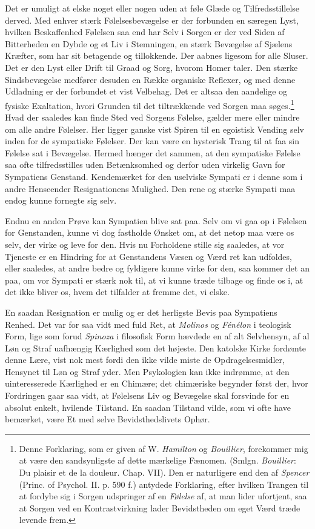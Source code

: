 \documentclass[12pt,a4paper,openany]{book}
\newcommand{\opage}[1]{\marginnote{\footnotesize\textit{[#1]}}}
\begin{document}
Det er umuligt at elske noget eller nogen uden at føle Glæde og
Tilfredsstillelse derved. Med enhver stærk Følelsesbevægelse er der
forbunden en særegen Lyst, hvilken Beskaffenhed Følelsen saa end har
Selv i Sorgen er der ved Siden af Bitterheden en Dybde og et Liv i
Stemningen, en stærk Bevægelse af Sjælens Kræfter, som har sit betagende
og tillokkende. Der aabnes ligesom for alle Sluser. Det er den Lyst
eller Drift til Graad og Sorg, hvorom Homer taler. Den stærke
Sindsbevægelse medfører desuden en Række organiske Reflexer, og med
denne Udladning er der forbundet et vist Velbehag. Det er altsaa den
aandelige og fysiske Exaltation, hvori Grunden til det tiltrækkende ved
Sorgen maa søges.\footnote[1]{Denne Forklaring, som er given af W.
\emph{Hamilton} og \emph{Bouillier}, forekommer mig at være den
sandsynligste af dette mærkelige Fænomen. (Smlgn. \emph{Bouillier}: Du
plaisir et de la douleur. Chap. VII). Den er naturligere end den af
\emph{Spencer} (Princ. of Psychol. II. p. 590 f.) antydede Forklaring,
efter hvilken Trangen til at fordybe sig i Sorgen udspringer af en
\emph{Følelse} af, at man lider ufortjent, saa at Sorgen ved en
Kontrastvirkning lader Bevidstheden om eget Værd træde levende frem.}
\opage{309}Hvad der saaledes kan finde Sted ved Sorgens Følelse, gælder
mere eller mindre om alle andre Følelser. Her ligger ganske vist Spiren
til en egoistisk Vending selv inden for de sympatiske Følelser. Der kan
være en hysterisk Trang til at faa sin Følelse sat i Bevægelse. Hermed
hænger det sammen, at den sympatiske Følelse saa ofte tilfredsstilles
uden Betænksomhed og derfor uden virkelig Gavn for Sympatiens Genstand.
Kendemærket for den uselviske Sympati er i denne som i andre Henseender
Resignationens Mulighed. Den rene og stærke Sympati maa endog kunne
fornegte sig selv.

Endnu en anden Prøve kan Sympatien blive sat paa. Selv om vi gaa op i
Følelsen for Genstanden, kunne vi dog fastholde Ønsket om, at det netop
maa være os selv, der virke og leve for den. Hvis nu Forholdene stille
sig saaledes, at vor Tjeneste er en Hindring for at Genstandens Væsen og
Værd ret kan udfoldes, eller saaledes, at andre bedre og fyldigere kunne
virke for den, saa kommer det an paa, om vor Sympati er stærk nok til,
at vi kunne træde tilbage og finde os i, at det ikke bliver os, hvem det
tilfalder at fremme det, vi elske.

En saadan Resignation er mulig og er det herligste Bevis paa Sympatiens
Renhed. Det var for saa vidt med fuld Ret, at \emph{Molinos} og
\emph{Fénélon} i teologisk Form, lige som forud \emph{Spinoza} i
filosofisk Form hævdede en af alt Selvhensyn, af al Løn og Straf
uafhængig Kærlighed som det højeste. Den katolske Kirke fordømte denne
Lære, vist nok mest fordi den ikke vilde miste de Opdragelsesmidler,
Hensynet til Løn og Straf yder. Men Psykologien kan ikke indrømme, at
den uinteresserede Kærlighed er en Chimære; det chimæriske begynder
først der, hvor Fordringen gaar saa vidt, at Følelsens Liv og Bevægelse
skal forsvinde for en absolut enkelt, hvilende Tilstand. En saadan
Tilstand vilde, som vi ofte have bemærket, være Et med selve
Bevidsthedslivets Ophør.
\end{document}
